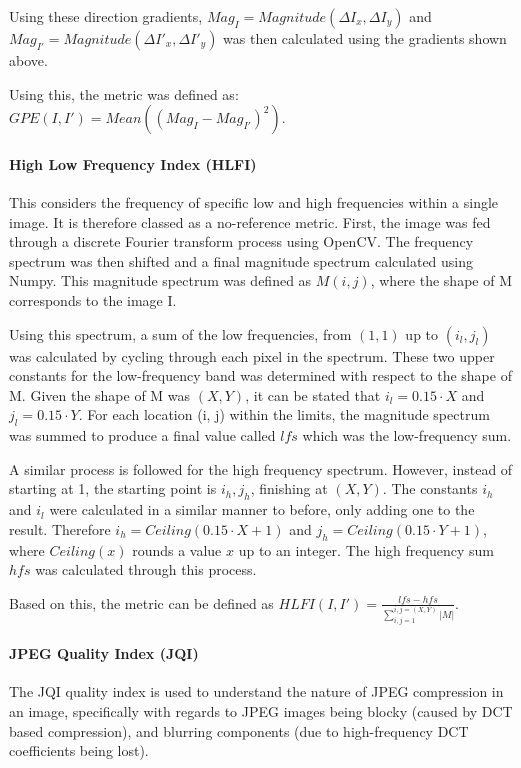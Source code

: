 \documentclass[12pt,a4paper]{article}
\begin{document}
                Using these direction gradients, $Mag_{I} = Magnitude(\Delta I_x, \Delta I_y)$ and $Mag_{I'} = Magnitude(\Delta I'_x, \Delta I'_y)$ was then calculated using the gradients shown above.

                Using this, the metric was defined as: $GPE(I, I') = Mean((Mag_{I} - Mag_{I'})^2)$.

            \paragraph{High Low Frequency Index (HLFI)}
                This considers the frequency of specific low and high frequencies within a single image. It is therefore classed as a no-reference metric.
                First, the image was fed through a discrete Fourier transform process using OpenCV. The frequency spectrum was then shifted and a final magnitude spectrum calculated using Numpy. This magnitude spectrum was defined as $M(i, j)$, where the shape of M corresponds to the image I.

                Using this spectrum, a sum of the low frequencies, from $(1,1)$ up to $(i_l, j_l)$ was calculated by cycling through each pixel in the spectrum. These two upper constants for
                the low-frequency band was determined with respect to the shape of M. Given the shape of M was $(X, Y)$, it can be stated that $i_l = 0.15 \cdot X$ and $j_l = 0.15 \cdot Y$.
                For each location (i, j) within the limits, the magnitude spectrum was summed to produce a final value called $lfs$ which was the low-frequency sum.

                A similar process is followed for the high frequency spectrum. However, instead of starting at 1, the starting point is $i_h, j_h$, finishing at $(X, Y)$. The constants $i_h$ and $i_l$ were
                calculated in a similar manner to before, only adding one to the result. Therefore $i_h = Ceiling(0.15 \cdot X + 1)$ and $j_h = Ceiling(0.15 \cdot Y + 1)$, where $Ceiling(x)$ rounds
                a value $x$ up to an integer. The high frequency sum $hfs$ was calculated through this process.

                Based on this, the metric can be defined as $HLFI(I, I') = \frac{lfs - hfs}{\sum_{i,j = 1}^{i,j = (X, Y)} |M|}$.
                
            \paragraph{JPEG Quality Index (JQI)}
                The JQI quality index is used to understand the nature of JPEG compression in an image, specifically with regards to JPEG images being blocky (caused by DCT based compression),
                and blurring components (due to high-frequency DCT coefficients being lost).
\end{document}

